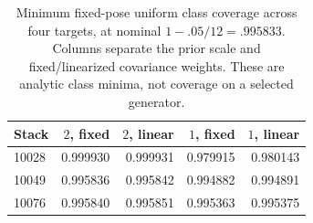 \begin{table}[t]
\centering\small
\caption{Minimum fixed-pose uniform class coverage across four targets, at nominal $1-.05/12=.995833$. Columns separate the prior scale and fixed/linearized covariance weights. These are analytic class minima, not coverage on a selected generator.}
\label{tab:gpclass}
\begin{tabular}{lrrrr}\toprule
Stack & $2$, fixed & $2$, linear & $1$, fixed & $1$, linear \\\midrule
10028 & 0.999930 & 0.999931 & 0.979915 & 0.980143 \\
10049 & 0.995836 & 0.995842 & 0.994882 & 0.994891 \\
10076 & 0.995840 & 0.995851 & 0.995363 & 0.995375 \\
\bottomrule\end{tabular}\end{table}

